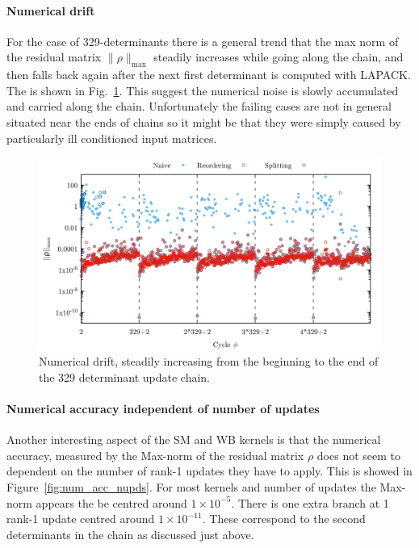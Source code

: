 \documentclass[11pt]{article}
\numberwithin{figure}{section}
\numberwithin{table}{section}
\begin{document}
				\paragraph{Numerical drift} For the case of 329-determinants there is a general trend that the max norm of the residual matrix $\|\rho\|_\mathrm{max}$ steadily increases while going along the chain, and then falls back again after the next first determinant is computed with LAPACK. The is shown in Fig.~\ref{fig:numerical-drift}. This suggest the numerical noise is slowly accumulated and carried along the chain. Unfortunately the failing cases are not in general situated near the ends of chains so it might be that they were simply caused by particularly ill conditioned input matrices.\\
\begin{figure}
	\includegraphics[width=\linewidth]{drift.png}
	\caption{Numerical drift, steadily increasing from the beginning to the end of the 329 determinant update chain.}
	\label{fig:numerical-drift}
\end{figure}
				
				\paragraph{Numerical accuracy independent of number of updates} Another interesting aspect of the SM and WB kernels is that the numerical accuracy, measured by  the Max-norm of the residual matrix $\rho$ does not seem to dependent on the number of rank-1 updates they have to apply. This is showed in Figure~\ref{fig:num_acc_nupds}. For most kernels and number of updates the Max-norm appears the be centred around $1\times10^{-5}$. There is one extra branch at 1 rank-1 update centred around $1\times10^{-11}$. These correspond to the second determinants in the chain as discussed just above.
\end{document}
